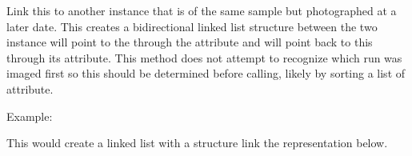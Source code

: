 \documentclass[letterpaper,10pt,english]{sphinxmanual}
\begin{document}
\begin{fulllineitems}
\begin{fulllineitems}
\label{\detokenize{polo.crystallography:polo.crystallography.run.HWIRun.link_to_next_date}}
Link this {\hyperref[\detokenize{polo.crystallography:polo.crystallography.run.HWIRun}]{}} to another 
{\hyperref[\detokenize{polo.crystallography:polo.crystallography.run.HWIRun}]{}} instance that is of the same
sample but photographed at a later date. This creates a
bi\sphinxhyphen{}directional linked list structure between the two 
 instance will point to the 
 through the 
 attribute and
 will point back to this {\hyperref[\detokenize{polo.crystallography:polo.crystallography.run.HWIRun}]{}} through
its 
attribute. This method does not attempt to recognize
which run was imaged first so this should be determined before calling,
likely by sorting a list of  attribute.

Example:

\begin{sphinxVerbatim}[commandchars=\\\{\}]
  \PYG{p}{[}   \PYG{p}{]}
     
\PYG{p}{[}\PYG{p}{[}\PYG{p}{]}\PYG{p}{[}\PYG{p}{]}    \PYG{p}{]}
\end{sphinxVerbatim}

This would create a linked list with a structure link the representation
below.


\end{fulllineitems}
\end{fulllineitems}
\end{document}
